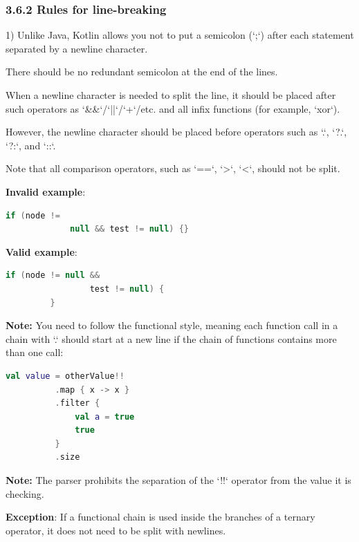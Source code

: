 {\subsubsection*{\textbf{3.6.2 Rules for line-breaking}}
\leavevmode\newline



1) Unlike Java, Kotlin allows you not to put a semicolon (`;`) after each statement separated by a newline character.

    There should be no redundant semicolon at the end of the lines.

 

When a newline character is needed to split the line, it should be placed after such operators as `\&\&`/`||`/`+`/etc. and all infix functions (for example, `xor`).

However, the newline character should be placed before operators such as `.`, `?.`, `?:`, and `::`.



Note that all comparison operators, such as `==`, `>`, `<`, should not be split.



\textbf{Invalid example}: 

\begin{lstlisting}[language=Kotlin]
     if (node !=
             null && test != null) {}
\end{lstlisting}
 

\textbf{Valid example}: 

\begin{lstlisting}[language=Kotlin]
         if (node != null && 
                 test != null) {
         }
\end{lstlisting}
  

\textbf{Note:} You need to follow the functional style, meaning each function call in a chain with `.` should start at a new line if the chain of functions contains more than one call:

\begin{lstlisting}[language=Kotlin]
  val value = otherValue!!
          .map { x -> x }
          .filter {
              val a = true
              true
          }
          .size    
\end{lstlisting}
\textbf{Note:} The parser prohibits the separation of the `!!` operator from the value it is checking.



\textbf{Exception}: If a functional chain is used inside the branches of a ternary operator, it does not need to be split with newlines.



}
